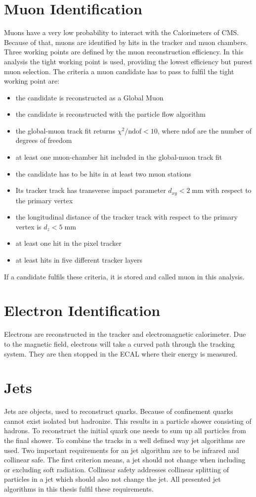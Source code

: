 \section{Muon Identification}
	Muons have a very low probability to interact with the Calorimeters of CMS. Because of that, muons are identified by hits in the tracker and muon chambers. Three working points are defined by the muon reconstruction efficiency. In this analysis the tight working point \cite{MuonID} is used, providing the lowest efficiency but purest muon selection. The criteria a muon candidate has to pass to fulfil the tight working point are:
	\begin{itemize}
	\item the candidate is reconstructed as a Global Muon 
	\item the candidate is reconstructed with the particle flow algorithm 
	\item the global-muon track fit returns $\chi^2/ \text{ndof} < 10$, where ndof are the number of degrees of freedom
	\item at least one muon-chamber hit included in the global-muon track fit 
	\item the candidate has to be hits in at least two muon stations
	\item Its tracker track has transverse impact parameter $d_{xy} < 2\;\text{mm}$ with respect to the primary vertex 
	\item the longitudinal distance of the tracker track with respect to the primary vertex is $d_{z} < 5\;\text{mm}$
	\item at least one hit in the pixel tracker 
	\item at least hits in five different tracker layers
	\end{itemize}
	If a candidate fulfils these criteria, it is stored and called muon in this analysis.
\section{Electron Identification}
	Electrons are reconstructed in the tracker and electromagnetic calorimeter. Due to the magnetic field, electrons will take a curved path through the tracking system. They are then stopped in the ECAL where their energy is measured.

\section{Jets}
	Jets are objects, used to reconstruct quarks. Because of confinement quarks cannot exist isolated but hadronize. This results in a particle shower consisting of hadrons. To reconstruct the initial quark one needs to sum up all particles from the final shower. To combine the tracks in a well defined way jet algorithms are used. Two important requirements for an jet algorithm are to be infrared and collinear safe. The first criterion means, a jet should not change when including or excluding soft radiation. Collinear safety addresses collinear splitting of particles in a jet which should also not change the jet. All presented jet algorithms in this thesis fulfil these requirements.
